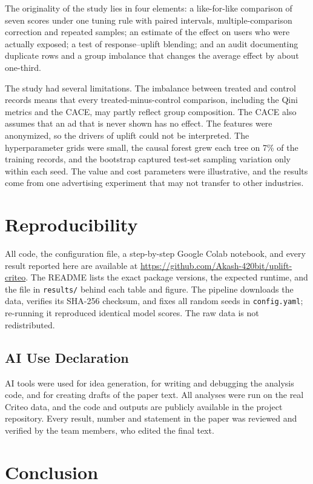 \documentclass[conference]{IEEEtran}
\begin{document}
The originality of the study lies in four elements: a like-for-like
comparison of seven scores under one tuning rule with paired intervals,
multiple-comparison correction and repeated samples; an estimate of the
effect on users who were actually exposed; a test of response--uplift
blending; and an audit documenting duplicate rows and a group imbalance
that changes the average effect by about one-third.

The study had several limitations. The imbalance between treated and
control records means that every treated-minus-control comparison,
including the Qini metrics and the CACE, may partly reflect group
composition. The CACE also assumes that an ad that is never shown has
no effect. The features were anonymized, so the drivers of uplift could
not be interpreted. The hyperparameter grids were small, the causal
forest grew each tree on 7\% of the training records, and the bootstrap
captured test-set sampling variation only within each seed. The value
and cost parameters were illustrative, and the results come from one
advertising experiment that may not transfer to other industries.

\section{Reproducibility}

All code, the configuration file, a step-by-step Google Colab notebook,
and every result reported here are available at
\url{https://github.com/Akash-420bit/uplift-criteo}. The README lists the
exact package versions, the expected runtime, and the file in
\texttt{results/} behind each table and figure. The pipeline downloads
the data, verifies its SHA-256 checksum, and fixes all random seeds in
\texttt{config.yaml}; re-running it reproduced identical model scores.
The raw data is not redistributed.

\subsection{AI Use Declaration}

AI tools were used for idea generation, for writing and debugging the
analysis code, and for creating drafts of the paper text. All analyses
were run on the real Criteo data, and the code and outputs are publicly
available in the project repository. Every result, number and statement
in the paper was reviewed and verified by the team members, who edited
the final text.

\section{Conclusion}
\end{document}
